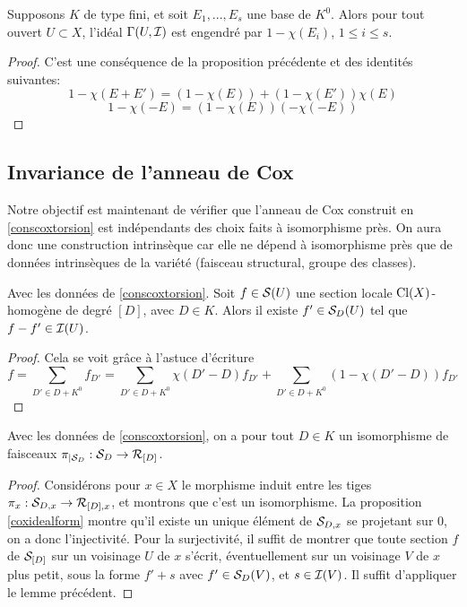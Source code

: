 \begin{cor}\label{genreatorsCoxIdeal}
Supposons $K$ de type fini, et soit $E_1,...,E_s$ une base de $K^0$. Alors pour tout ouvert $U\subset X$, l'idéal $\Gamma(U,\mathcal{I})$ est engendré par $1-\chi(E_i)$, $1\leq i\leq s$.
\end{cor}
\begin{proof}
C'est une conséquence de la proposition précédente et des identités suivantes:
$$1-\chi(E+E')=(1-\chi(E))+(1-\chi(E'))\chi(E)$$
$$1-\chi(-E)=(1-\chi(E))(-\chi(-E))$$
\end{proof}

\subsection{Invariance de l'anneau de Cox}

Notre objectif est maintenant de vérifier que l'anneau de Cox construit en \ref{conscoxtorsion} est indépendants des choix faits à isomorphisme près. On aura donc une construction intrinsèque car elle ne dépend à isomorphisme près que de données intrinsèques de la variété (faisceau structural, groupe des classes).

\begin{lem}\label{LemmeCoxRelevelement}
Avec les données de \ref{conscoxtorsion}. Soit $f\in \mathcal{S}(U)$ une section locale $\operatorname{Cl}(X)$-homogène de degré $[D]$, avec $D\in K$. Alors il existe $f'\in \mathcal{S}_D(U)$ tel que $f-f'\in\mathcal{I}(U)$.
\end{lem}
\begin{proof}
Cela se voit grâce à l'astuce d'écriture
$$f=\sum_{D'\in D+K^0}f_{D'}=\sum_{D'\in D+K^0}\chi(D'-D)f_{D'}+ \sum_{D'\in D+K^0}(1-\chi(D'-D))f_{D'}$$
\end{proof}


\begin{prop}\label{coxsheafiso2}
Avec les données de \ref{conscoxtorsion}, on a pour tout $D\in K$ un isomorphisme de faisceaux $\pi_{|\mathcal{S}_D}:\mathcal{S}_D\rightarrow \mathcal{R}_{[D]}$.
\end{prop}
\begin{proof}
Considérons pour $x\in X$ le morphisme induit entre les tiges $\pi_x:\mathcal{S}_{D,x}\rightarrow \mathcal{R}_{[D],x}$, et montrons que c'est un isomorphisme. La proposition \ref{coxidealform} montre qu'il existe un unique élément de $\mathcal{S}_{D,x}$ se projetant sur $0$, on a donc l'injectivité. Pour la surjectivité, il suffit de montrer que toute section $f$ de $\mathcal{S}_{[D]}$ sur un voisinage $U$ de $x$ s'écrit, éventuellement sur un voisinage $V$ de $x$ plus petit, sous la forme $f'+s$ avec $f'\in \mathcal{S}_D(V)$, et $s\in \mathcal{I}(V)$. Il suffit d'appliquer le lemme précédent.
\end{proof}

